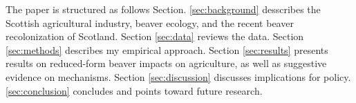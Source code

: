 The paper is structured as follows Section. \ref{sec:background} desscribes the Scottish agricultural industry, beaver ecology, and the recent beaver recolonization of Scotland. Section \ref{sec:data} reviews the data. Section \ref{sec:methods} describes my empirical approach. Section \ref{sec:results} presents results on reduced-form beaver impacts on agriculture, as well as suggestive evidence on mechanisms. Section \ref{sec:discussion} discusses implications for policy. \ref{sec:conclusion} concludes and points toward future research.